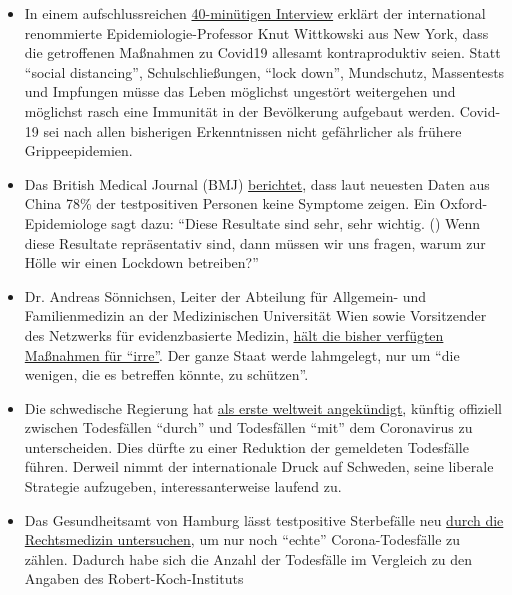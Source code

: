 \begin{itemize}
\tightlist
\item
  In einem aufschlussreichen
  \href{https://www.youtube.com/watch?v=lGC5sGdz4kg}{40-minütigen
  Interview} erklärt der international renommierte
  Epidemiologie-Professor Knut Wittkowski aus New York, dass die
  getroffenen Maßnahmen zu Covid19 allesamt kontraproduktiv seien. Statt
  ``social distancing'', Schulschließungen, ``lock down'', Mundschutz,
  Massentests und Impfungen müsse das Leben möglichst ungestört
  weitergehen und möglichst rasch eine Immunität in der Bevölkerung
  aufgebaut werden. Covid-19 sei nach allen bisherigen Erkenntnissen
  nicht gefährlicher als frühere Grippeepidemien.
\item
  Das British Medical Journal (BMJ)
  \href{https://www.bmj.com/content/369/bmj.m1375}{berichtet}, dass laut
  neuesten Daten aus China 78\% der testpositiven Personen keine
  Symptome zeigen. Ein Oxford-Epidemiologe sagt dazu: ``Diese Resultate
  sind sehr, sehr wichtig. () Wenn diese Resultate repräsentativ sind,
  dann müssen wir uns fragen, warum zur Hölle wir einen Lockdown
  betreiben?''
\item
  Dr. Andreas Sönnichsen, Leiter der Abteilung für Allgemein- und
  Familienmedizin an der Medizinischen Universität Wien sowie
  Vorsitzender des Netzwerks für evidenzbasierte Medizin,
  \href{https://www.diepresse.com/5794224/was-machen-wir-da-auf-den-intensivstationen-eigentlich}{hält
  die bisher verfügten Maßnahmen für ``irre''}. Der ganze Staat werde
  lahmgelegt, nur um ``die wenigen, die es betreffen könnte, zu
  schützen''.
\item
  Die schwedische Regierung hat
  \href{https://www.telegraph.co.uk/news/2020/04/03/coronavirus-swedish-experiment-could-prove-britain-wrong/}{als
  erste weltweit angekündigt}, künftig offiziell zwischen Todesfällen
  ``durch'' und Todesfällen ``mit'' dem Coronavirus zu unterscheiden.
  Dies dürfte zu einer Reduktion der gemeldeten Todesfälle führen.
  Derweil nimmt der internationale Druck auf Schweden, seine liberale
  Strategie aufzugeben, interessanterweise laufend zu.
\item
  Das Gesundheitsamt von Hamburg lässt testpositive Sterbefälle neu
  \href{https://www.t-online.de/nachrichten/deutschland/id_87636856/coronavirus-hamburg-will-nur-echte-covid-19-tote-zaehlen.html}{durch
  die Rechtsmedizin untersuchen}, um nur noch ``echte''
  Corona-Todesfälle zu zählen. Dadurch habe sich die Anzahl der
  Todesfälle im Vergleich zu den Angaben des Robert-Koch-Instituts

\end{itemize}
